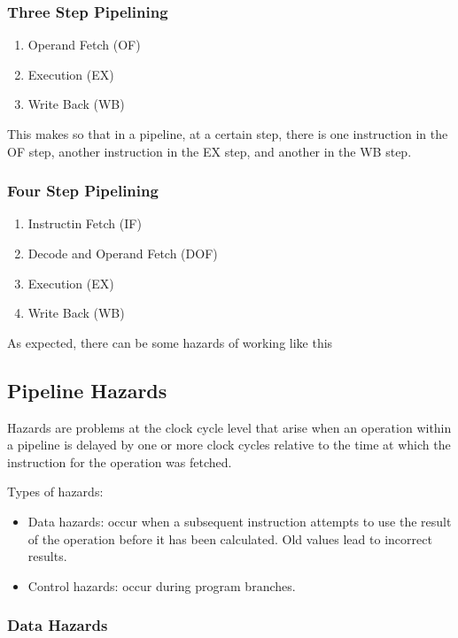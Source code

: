 \documentclass{article}
\begin{document}
\subsubsection{Three Step Pipelining}
\begin{enumerate}
  \item Operand Fetch (OF)
  \item Execution (EX)
  \item Write Back (WB)
\end{enumerate}

This makes so that in a pipeline, at a certain step, there is one instruction in the OF step, another instruction in the EX step, and another in the WB step.

\subsubsection{Four Step Pipelining}
\begin{enumerate}
  \item Instructin Fetch (IF)
  \item Decode and Operand Fetch (DOF)
  \item Execution (EX)
  \item Write Back (WB)
\end{enumerate}


As expected, there can be some hazards of working like this

\subsection{Pipeline Hazards}
Hazards are problems at the clock cycle level that arise when an
operation within a pipeline is delayed by one or more clock cycles
relative to the time at which the instruction for the
operation was fetched.


Types of hazards:
\begin{itemize}
  \item Data hazards: occur when a subsequent instruction attempts to use the
result of the operation before it has been calculated. Old
values lead to incorrect results.
 \item Control hazards: occur during program branches.
\end{itemize}

\subsubsection{Data Hazards}
\end{document}
